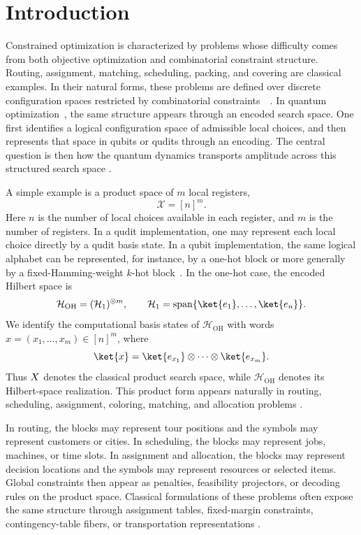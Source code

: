 \documentclass[a4paper,onecolumn,11pt,unpublished]{quantumarticle}
\theoremstyle{remark}
\newcommand{\OH}{\mathcal{H}_{\mathrm{OH}}}
\begin{document}
\section{Introduction}
\label{subsec:motivation-radialization}

Constrained  optimization is characterized by problems whose difficulty comes from both objective optimization and combinatorial constraint structure.
Routing, assignment, matching, scheduling, packing, and covering are classical examples. In their natural forms, these problems are defined over discrete configuration spaces restricted by combinatorial constraints~~\cite{KorteVygen,Schrijver2003}. In quantum
optimization~\cite{abbas2024challenges,Lucas2014,Farhi2014QAOA,Lucas2014,Hadfield2019AOA,onahce}, the same structure appears through an encoded search space. One first identifies a logical configuration space of admissible local choices, and then represents that space in qubits or qudits through an encoding. The central question is then how the quantum dynamics transports amplitude across this structured search space \cite{Farhi2014QAOA,Hadfield2019AOA,Wang2020XYMixers,Hadfield_2022,Fuchs2022ConstrainedMixers,sawaya2023encoding,onahfund,onahce}.

A simple example is a product space of \(m\) local registers,
\begin{equation}
\label{eq:product-space}
\mathcal X=[n]^m .
\end{equation}
Here \(n\) is the number of local choices available in each register, and \(m\) is the number of registers. In a qudit implementation, one may represent each local choice directly by a qudit basis state. In a qubit implementation, the same logical alphabet can be represented, for instance, by a one-hot block or more generally by a fixed-Hamming-weight \(k\)-hot block~\cite{Hadfield2019AOA}. In the one-hot case, the encoded Hilbert space is \[ \OH=(\mathcal H_1)^{\otimes m}, \qquad \mathcal H_1 = \operatorname{span}\{\ket{e_1},\dots,\ket{e_n}\}. \] We identify the computational basis states of \(\OH\) with words \(x=(x_1,\dots,x_m)\in[n]^m\), where \[ \ket{x} = \ket{e_{x_1}}\otimes\cdots\otimes\ket{e_{x_m}}. \] Thus \(\mathcal \mathcal X\) denotes the classical product search space, while \(\OH\) denotes its Hilbert-space realization. This product form appears naturally in routing, scheduling, assignment, coloring, matching, and allocation problems \cite{Hadfield2019AOA,onahce}. 

In routing, the blocks may represent tour positions and the symbols may represent customers or cities. In scheduling, the blocks may represent jobs, machines, or time slots. In assignment and allocation, the blocks may represent decision locations and the symbols may represent resources or selected items. Global constraints then appear as penalties, feasibility projectors, or decoding rules on the product space. Classical formulations of these problems often expose the same structure through assignment tables, fixed-margin constraints, contingency-table fibers, or transportation representations
\cite{MillerTuckerZemlin1960,DiaconisSturmfels1998,DeLoeraOnn2004,
DeLoeraOnn2006,SlavkovicZhuPetrovic2015}. 
\end{document}
